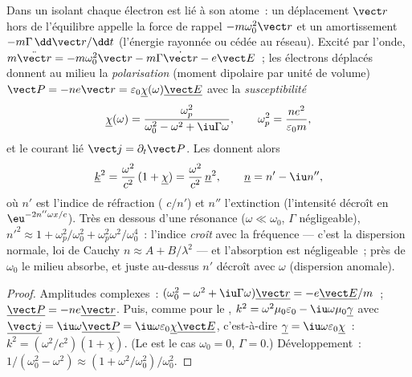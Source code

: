 \begin{proposition}\label{prop:b2:waves-in-media:lorentz}
Dans un isolant chaque électron est lié à son atome~: un déplacement
$\vect r$ hors de l'équilibre appelle la force de rappel $-m\omega_0^2\vect r$ et
un amortissement $-m\Gamma\,\dd\vect r/\dd t$ (l'énergie rayonnée ou cédée au
réseau). Excité par l'onde, $m\ddot{\vect r} = -m\omega_0^2\vect r - m\Gamma\dot{\vect r}
- e\vect E$~; les électrons déplacés donnent au milieu la \emph{polarisation}
(moment dipolaire par unité de volume) $\vect P = -ne\vect r = \varepsilon_0\underline\chi(\omega)
\underline{\vect E}$ avec la \emph{susceptibilité}
\[
\underline\chi(\omega) = \frac{\omega_p^2}{\omega_0^2 - \omega^2 + \iu\Gamma\omega} ,
\qquad \omega_p^2 = \frac{ne^2}{\varepsilon_0m} ,
\]
et le courant lié $\vect j = \partial_t\vect P$. Les  donnent alors
\[
\underline k^2 = \frac{\omega^2}{c^2}\,(1 + \underline\chi) = \frac{\omega^2}{c^2}\,\underline n^2 ,
\qquad \underline n = n' - \iu n'' ,
\]
où $n'$ est l'indice de réfraction ( $c/n'$) et $n''$
l'extinction (l'intensité décroît en $\eu^{-2n''\omega x/c}$). Très en dessous d'une
résonance ($\omega \ll \omega_0$, $\Gamma$ négligeable), $n'^2 \approx 1 + \omega_p^2/\omega_0^2 +
\omega_p^2\omega^2/\omega_0^4$~: l'indice \emph{croît} avec la fréquence --- c'est la
dispersion normale, loi de Cauchy $n \approx A + B/\lambda^2$ --- et l'absorption est
négligeable~; près de $\omega_0$ le milieu absorbe, et juste au-dessus $n'$
décroît avec $\omega$ (dispersion anomale).
\end{proposition}

\begin{proof}
Amplitudes complexes~: $(\omega_0^2 - \omega^2 + \iu\Gamma\omega)\underline{\vect r} = -e\underline{\vect E}
/m$~; $\underline{\vect P} = -ne\underline{\vect r}$. Puis, comme pour le , $k^2 = \omega^2\mu_0
\varepsilon_0 - \iu\omega\mu_0\underline\gamma$ avec $\underline{\vect j} = \iu\omega\underline{\vect P} = \iu\omega\varepsilon_0
\underline\chi\underline{\vect E}$, c'est-à-dire $\underline\gamma = \iu\omega\varepsilon_0\underline\chi$~: $k^2 = (\omega^2/c^2)
(1 + \underline\chi)$. (Le  est le cas $\omega_0 = 0$, $\Gamma = 0$.)
Développement~: $1/(\omega_0^2 - \omega^2) \approx (1 + \omega^2/\omega_0^2)/\omega_0^2$.
\end{proof}

